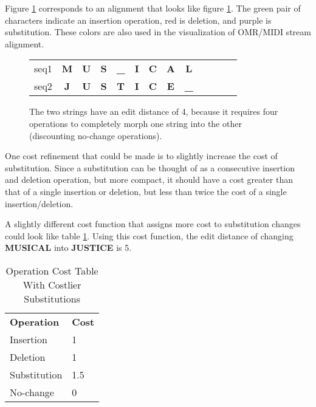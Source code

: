 Figure \ref{best-alignment} corresponds to an alignment that looks like figure \ref{best-alignment}. The green pair of characters indicate an insertion operation, red is deletion, and purple is substitution. These colors are also used in the visualization of OMR/MIDI stream alignment. 

\begin{figure}[!h]
\centering
\begin{tabular}{lcccccccccccc}
seq1 & {\color[HTML]{6200C9} \textbf{M}} & \textbf{U} & \textbf{S} & {\color[HTML]{009901} \textbf{\_}} & \textbf{I} & \textbf{C} & {\color[HTML]{6200C9} \textbf{A}} & {\color[HTML]{9A0000} \textbf{L}}  & \textbf{} & \textbf{} & \textbf{} &  \\
seq2 & {\color[HTML]{6200C9} \textbf{J}} & \textbf{U} & \textbf{S} & {\color[HTML]{009901} \textbf{T}}  & \textbf{I} & \textbf{C} & {\color[HTML]{6200C9} \textbf{E}} & {\color[HTML]{9A0000} \textbf{\_}} & \textbf{} & \textbf{} & \textbf{} & 
\end{tabular}
\caption[Alignment of MUSICAL and JUSTICE]{The two strings have an edit distance of 4, because it requires four operations to completely morph one string into the other (discounting no-change operations).}
\label{best-alignment}
\end{figure}

One cost refinement that could be made is to slightly increase the cost of substitution. Since a substitution can be thought of as a consecutive insertion and deletion operation, but more compact, it should have a cost greater than that of a single insertion or deletion, but less than twice the cost of a single insertion/deletion. 

A slightly different cost function that assigns more cost to substitution changes could look like table \ref{tab:naivetable2}. Using this cost function, the edit distance of changing \textbf{MUSICAL} into \textbf{JUSTICE} is 5.
\begin{table}[!h]
\centering
\begin{tabular}{ll}
\textbf{Operation} & \textbf{Cost} \\
Insertion          & 1             \\
Deletion           & 1             \\
Substitution       & 1.5             \\
No-change          & 0            
\end{tabular}
\caption{Operation Cost Table With Costlier Substitutions}
\label{tab:naivetable2}
\end{table}

